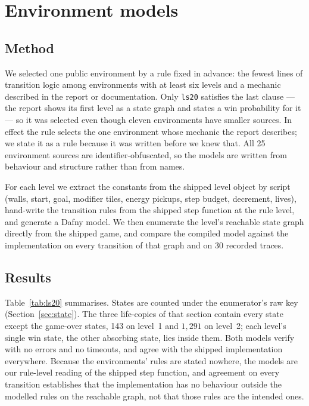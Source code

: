 \documentclass[11pt]{article}
\newcommand{\code}[1]{\texttt{#1}}
\begin{document}
\section{Environment models}
\label{sec:env}

\subsection{Method}

We selected one public environment by a rule fixed in advance: the fewest lines
of transition logic among environments with at least six levels and a mechanic
described in the report or documentation. Only \code{ls20} satisfies the last
clause --- the report shows its first level as a state graph and states a win
probability for it --- so it was selected even though eleven environments have
smaller sources. In effect the rule selects the one environment whose mechanic
the report describes; we state it as a rule because it was written before we
knew that. All 25 environment sources are identifier-obfuscated, so the
models are written from behaviour and structure rather than from names.

For each level we extract the constants from the shipped level object by script
(walls, start, goal, modifier tiles, energy pickups, step budget, decrement,
lives), hand-write the transition rules from the shipped step function at the
rule level, and generate a Dafny model. We then enumerate the level's reachable
state graph directly from the shipped game, and compare the compiled model
against the implementation on every transition of that graph and on 30 recorded
traces.

\subsection{Results}

Table~\ref{tab:ls20} summarises. States are counted under the enumerator's raw
key (Section~\ref{sec:state}). The three life-copies of that section contain every
state except the game-over states, 143 on level~1 and $1{,}291$ on level~2;
each level's single win state, the other absorbing state, lies inside them. Both models verify with no errors and no timeouts, and agree with the
shipped implementation everywhere. Because the environments' rules are stated
nowhere, the models are our rule-level reading of the shipped step function,
and agreement on every transition establishes that the implementation has no
behaviour outside the modelled rules on the reachable graph, not that those
rules are the intended ones.
\end{document}
